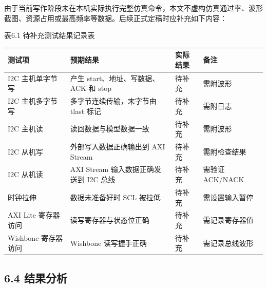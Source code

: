 由于当前写作阶段未在本机实际执行完整仿真命令，本文不虚构仿真通过率、波形截图、资源占用或最高频率等数据。后续正式定稿时应补充如下内容：

表6.1 待补充测试结果记录表

{\def\LTcaptype{none} %
\begin{longtable}[]{@{}
  >{\raggedright\arraybackslash}p{}
  >{\raggedright\arraybackslash}p{}
  >{\raggedright\arraybackslash}p{}
  >{\raggedright\arraybackslash}p{}@{}}
\toprule\noalign{}
\begin{minipage}[b]{\linewidth}\raggedright
测试项
\end{minipage} & \begin{minipage}[b]{\linewidth}\raggedright
预期结果
\end{minipage} & \begin{minipage}[b]{\linewidth}\raggedright
实际结果
\end{minipage} & \begin{minipage}[b]{\linewidth}\raggedright
备注
\end{minipage} \\
\midrule\noalign{}
\endhead
\bottomrule\noalign{}
\endlastfoot
I2C 主机单字节写 & 产生 start、地址、写数据、ACK 和 stop & 待补充 &
需附波形 \\
I2C 主机多字节写 & 多字节连续传输，末字节由 tlast 标记 & 待补充 &
需附日志 \\
I2C 主机读 & 读回数据与模型数据一致 & 待补充 & 需附波形 \\
I2C 从机写 & 外部写入数据正确输出到 AXI Stream & 待补充 &
需附检查结果 \\
I2C 从机读 & AXI Stream 输入数据正确发送到 I2C 总线 & 待补充 & 需验证
ACK/NACK \\
时钟拉伸 & 数据未准备好时 SCL 被拉低 & 待补充 & 需设置输入暂停 \\
AXI Lite 寄存器访问 & 读写寄存器与状态位正确 & 待补充 &
需记录寄存器值 \\
Wishbone 寄存器访问 & Wishbone 读写握手正确 & 待补充 & 需记录总线波形 \\
\end{longtable}
}

\subsection{6.4 结果分析}\label{ux7ed3ux679cux5206ux6790}

